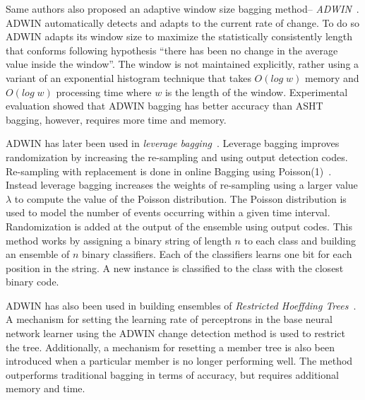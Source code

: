 Same authors also proposed an adaptive window size bagging method-- \textit{ADWIN}~\cite{bifet09:asht}. ADWIN automatically detects and adapts to the current rate of change. To do so ADWIN adapts its window size to maximize the statistically consistently length that conforms following hypothesis ``there has been no change in the average value inside the window''. The window is not maintained explicitly, rather using a variant of an exponential histogram technique that takes $O(log\;w)$ memory and $O(log\;w)$ processing time where $w$ is the length of the window. Experimental evaluation showed that ADWIN bagging has better accuracy than ASHT bagging, however, requires more time and memory. 

ADWIN has later been used in \textit{leverage bagging}~\cite{bifet10:levbag}. Leverage bagging improves randomization by increasing the re-sampling and using output detection codes. Re-sampling with replacement is done in online Bagging using Poisson(1)~\cite{oza01:obagboost}. Instead leverage bagging increases the weights of re-sampling using a larger value $\lambda$ to compute the value of the Poisson distribution. The Poisson distribution is used to model the number of events occurring within a given time interval. Randomization is added at the output of the ensemble using output codes. This method works by assigning a binary string of length $n$ to each class and building an ensemble of $n$ binary classifiers. Each of the classifiers learns one bit for each position in the string. A new instance is classified to the class with the closest binary code. 

ADWIN has also been used in building ensembles of \textit{Restricted Hoeffding Trees}~\cite{bifet10:rht}. A mechanism for setting the learning rate of perceptrons in the base neural network learner using the ADWIN change detection method is used to restrict the tree. Additionally, a mechanism for resetting a member tree is also been introduced when a particular member is no longer performing well. The method outperforms traditional bagging in terms of accuracy, but requires additional memory and time.

